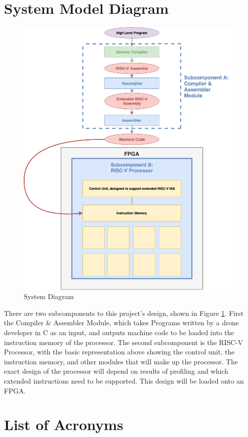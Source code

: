 \documentclass[11pt, oneside]{article}      %
\begin{document}
\section{System Model Diagram}

\begin{figure}[!htbp]
\begin{centering}
\includegraphics[width=\linewidth]{img/systemDiagram.png} 
\caption{System Diagram}
\label{fig:systemDiagram}
\end{centering}
\end{figure}

There are two subcomponents to this project's design, shown in Figure \ref{fig:systemDiagram}. First the Compiler \& Assembler Module, which takes Programs written by a drone developer in C as an input, and outputs machine code to be loaded into the instruction memory of the processor. The second subcomponent is the RISC-V Processor, with the basic representation above showing the control unit, the instruction memory, and other modules that will make up the processor. The exact design of the processor will depend on results of profiling and which extended instructions need to be supported. This design will be loaded onto an FPGA.

\clearpage

\clearpage

\section{List of Acronyms}



\clearpage



\end{document}
